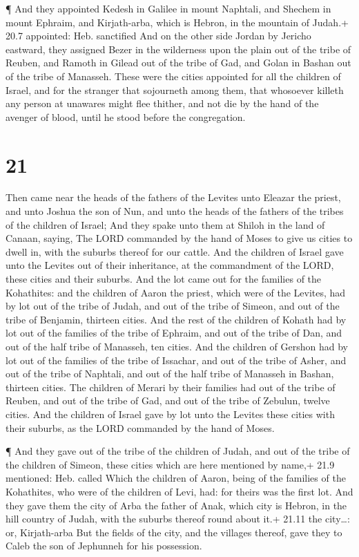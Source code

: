  ¶ And they appointed Kedesh in Galilee in mount Naphtali,
and Shechem in mount Ephraim, and Kirjath-arba, which is Hebron, in the
mountain of Judah.+ 20.7 appointed: Heb. sanctified  And on
the other side Jordan by Jericho eastward, they assigned Bezer in the
wilderness upon the plain out of the tribe of Reuben, and Ramoth in
Gilead out of the tribe of Gad, and Golan in Bashan out of the tribe of
Manasseh.  These were the cities appointed for all the
children of Israel, and for the stranger that sojourneth among them,
that whosoever killeth any person at unawares might flee thither, and
not die by the hand of the avenger of blood, until he stood before the
congregation.

\hypertarget{section-20}{%
\section{21}\label{section-20}}

 Then came near the heads of the fathers of the Levites unto
Eleazar the priest, and unto Joshua the son of Nun, and unto the heads
of the fathers of the tribes of the children of Israel;  And
they spake unto them at Shiloh in the land of Canaan, saying, The LORD
commanded by the hand of Moses to give us cities to dwell in, with the
suburbs thereof for our cattle.  And the children of Israel
gave unto the Levites out of their inheritance, at the commandment of
the LORD, these cities and their suburbs.  And the lot came
out for the families of the Kohathites: and the children of Aaron the
priest, which were of the Levites, had by lot out of the tribe of Judah,
and out of the tribe of Simeon, and out of the tribe of Benjamin,
thirteen cities.  And the rest of the children of Kohath had
by lot out of the families of the tribe of Ephraim, and out of the tribe
of Dan, and out of the half tribe of Manasseh, ten cities. 
And the children of Gershon had by lot out of the families of the tribe
of Issachar, and out of the tribe of Asher, and out of the tribe of
Naphtali, and out of the half tribe of Manasseh in Bashan, thirteen
cities.  The children of Merari by their families had out of
the tribe of Reuben, and out of the tribe of Gad, and out of the tribe
of Zebulun, twelve cities.  And the children of Israel gave
by lot unto the Levites these cities with their suburbs, as the LORD
commanded by the hand of Moses.

 ¶ And they gave out of the tribe of the children of Judah,
and out of the tribe of the children of Simeon, these cities which are
here mentioned by name,+ 21.9 mentioned: Heb. called  Which
the children of Aaron, being of the families of the Kohathites, who were
of the children of Levi, had: for theirs was the first lot.
 And they gave them the city of Arba the father of Anak,
which city is Hebron, in the hill country of Judah, with the suburbs
thereof round about it.+ 21.11 the city\ldots: or, Kirjath-arba
 But the fields of the city, and the villages thereof, gave
they to Caleb the son of Jephunneh for his possession.

